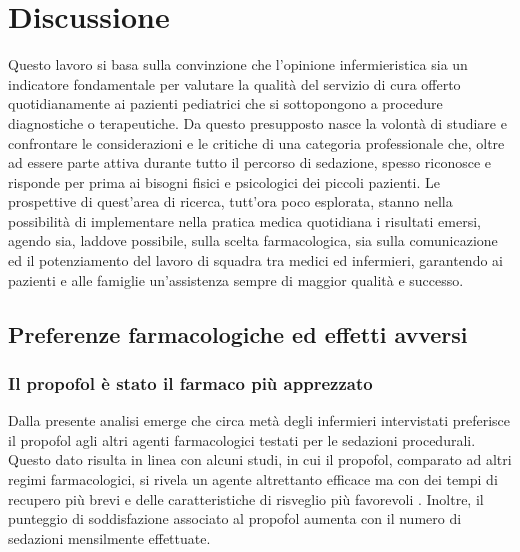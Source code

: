 \chapter{Discussione}

Questo lavoro si basa sulla convinzione che l'opinione infermieristica sia un indicatore fondamentale per valutare la qualità del servizio di cura offerto quotidianamente ai pazienti pediatrici che si sottopongono a procedure diagnostiche o terapeutiche. Da questo presupposto nasce la volontà di studiare e confrontare le considerazioni e le critiche di una categoria professionale che, oltre ad essere parte attiva durante tutto il percorso di sedazione, spesso riconosce e risponde per prima ai bisogni fisici e psicologici dei piccoli pazienti. Le prospettive di quest'area di ricerca, tutt'ora poco esplorata, stanno nella possibilità di implementare nella pratica medica quotidiana i risultati emersi, agendo sia, laddove possibile, sulla scelta farmacologica, sia sulla comunicazione ed il potenziamento del lavoro di squadra tra medici ed infermieri, garantendo ai pazienti e alle famiglie un'assistenza sempre di maggior qualità e successo. 



\section{Preferenze farmacologiche ed effetti avversi}

\subsection*{Il propofol è stato il farmaco più apprezzato}
Dalla presente analisi emerge che circa metà degli infermieri intervistati preferisce il propofol agli altri agenti farmacologici testati per le sedazioni procedurali. Questo dato risulta in linea con alcuni studi, in cui il propofol, comparato ad altri regimi farmacologici, si rivela un agente altrettanto efficace ma con dei tempi di recupero più brevi e delle caratteristiche di risveglio più favorevoli \citep{Schacherer2019, Havel1999, Shah2011}. Inoltre, il punteggio di soddisfazione associato al propofol aumenta con il numero di sedazioni mensilmente effettuate.

